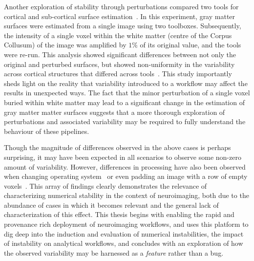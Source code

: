 Another exploration of stability through perturbations compared two tools for cortical and sub-cortical surface
estimation~\cite{Lewis2017-ll}. In this experiment, gray matter surfaces were estimated from a single image using two
toolboxes. Subsequently, the intensity of a single voxel within the white matter (centre of the Corpus Collusum) of the
image was amplified by $1\%$ of its original value, and the tools were re-run. This analysis showed significant
differences between not only the original and perturbed surfaces, but showed non-uniformity in the variability across
cortical structures that differed across tools~\cite{Lewis2017-ll}. This study importantly sheds light on the reality
that variability introduced to a workflow may affect the results in unexpected ways. The fact that the minor
perturbation of a single voxel buried within white matter may lead to a significant change in the estimation of gray
matter matter surfaces suggests that a more thorough exploration of perturbations and associated variability may be
required to fully understand the behaviour of these pipelines.

Though the magnitude of differences observed in the above cases is perhaps surprising, it may have been expected in all
scenarios to observe some non-zero amount of variability. However, differences in processing have also been observed
when changing operating system~\cite{Glatard2015-vc,salari2020file} or even padding an image with a row of empty
voxels~\cite{Glen2018-sg}. This array of findings clearly demonstrates the relevance of characterizing numerical
stability in the context of neuroimaging, both due to the abundance of cases in which it becomes relevant and the
general lack of characterization of this effect. This thesis begins with enabling the rapid and provenance rich
deployment of neuroimaging workflows, and uses this platform to dig deep into the induction and evaluation of
numerical instabilities, the impact of instability on analytical workflows, and concludes with an exploration of how
the observed variability may be harnessed as a \textit{feature} rather than a bug.

